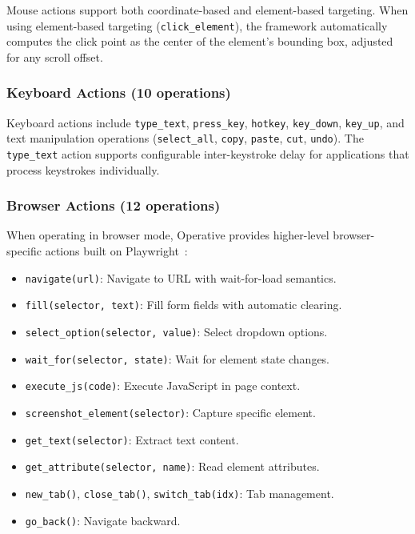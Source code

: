 \documentclass[11pt,twocolumn]{article}
\begin{document}
Mouse actions support both coordinate-based and element-based targeting. When using element-based targeting (\texttt{click\_element}), the framework automatically computes the click point as the center of the element's bounding box, adjusted for any scroll offset.

\subsubsection{Keyboard Actions (10 operations)}

Keyboard actions include \texttt{type\_text}, \texttt{press\_key}, \texttt{hotkey}, \texttt{key\_down}, \texttt{key\_up}, and text manipulation operations (\texttt{select\_all}, \texttt{copy}, \texttt{paste}, \texttt{cut}, \texttt{undo}). The \texttt{type\_text} action supports configurable inter-keystroke delay for applications that process keystrokes individually.

\subsubsection{Browser Actions (12 operations)}

When operating in browser mode, Operative provides higher-level browser-specific actions built on Playwright~\cite{playwright2024}:

\begin{itemize}[leftmargin=*]
    \item \texttt{navigate(url)}: Navigate to URL with wait-for-load semantics.
    \item \texttt{fill(selector, text)}: Fill form fields with automatic clearing.
    \item \texttt{select\_option(selector, value)}: Select dropdown options.
    \item \texttt{wait\_for(selector, state)}: Wait for element state changes.
    \item \texttt{execute\_js(code)}: Execute JavaScript in page context.
    \item \texttt{screenshot\_element(selector)}: Capture specific element.
    \item \texttt{get\_text(selector)}: Extract text content.
    \item \texttt{get\_attribute(selector, name)}: Read element attributes.
    \item \texttt{new\_tab()}, \texttt{close\_tab()}, \texttt{switch\_tab(idx)}: Tab management.
    \item \texttt{go\_back()}: Navigate backward.
\end{itemize}
\end{document}
